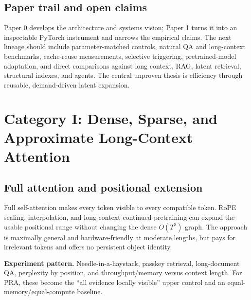 \documentclass[10pt,a4paper]{article}
\begin{document}
\subsection{Paper trail and open claims}
Paper 0 develops the architecture and systems vision; Paper 1 turns it into an inspectable PyTorch instrument and narrows the empirical claims. The next lineage should include parameter-matched controls, natural QA and long-context benchmarks, cache-reuse measurements, selective triggering, pretrained-model adaptation, and direct comparisons against long context, RAG, latent retrieval, structural indexes, and agents. The central unproven thesis is efficiency through reusable, demand-driven latent expansion.

\section{Category I: Dense, Sparse, and Approximate Long-Context Attention}
\subsection{Full attention and positional extension}
Full self-attention makes every token visible to every compatible token. RoPE scaling, interpolation, and long-context continued pretraining can expand the usable positional range without changing the dense $O(T^2)$ graph. The approach is maximally general and hardware-friendly at moderate lengths, but pays for irrelevant tokens and offers no persistent object identity.

\textbf{Experiment pattern.} Needle-in-a-haystack, passkey retrieval, long-document QA, perplexity by position, and throughput/memory versus context length. For PRA, these become the ``all evidence locally visible'' upper control and an equal-memory/equal-compute baseline.
\end{document}
